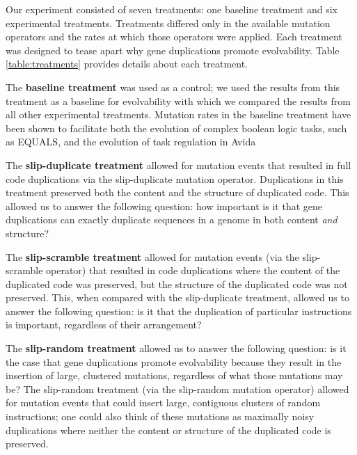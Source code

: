 

Our experiment consisted of seven treatments: one baseline treatment and six experimental treatments. Treatments differed only in the available mutation operators and the rates at which those operators were applied. Each treatment was designed to tease apart why gene duplications promote evolvability. Table \ref{table:treatments} provides details about each treatment.

The \textbf{baseline treatment} was used as a control; we used the results from this treatment as a baseline for evolvability with which we compared the results from all other experimental treatments. Mutation rates in the baseline treatment have been shown to facilitate both the evolution of complex boolean logic tasks, such as EQUALS, and the evolution of task regulation in Avida \citep{lenski2003evolutionary, Lalejini:2016plasticity}

The \textbf{slip-duplicate treatment} allowed for mutation events that resulted in full code duplications via the slip-duplicate mutation operator. Duplications in this treatment preserved both the content and the structure of duplicated code. This allowed us to answer the following question: how important is it that gene duplications can exactly duplicate sequences in a genome in both content \textit{and} structure?

The \textbf{slip-scramble treatment} allowed for mutation events (via the slip-scramble operator) that resulted in code duplications where the content of the duplicated code was preserved, but the structure of the duplicated code was not preserved. This, when compared with the slip-duplicate treatment, allowed us to answer the following question: is it that the duplication of particular instructions is important, regardless of their arrangement?

The \textbf{slip-random treatment} allowed us to answer the following question: is it the case that gene duplications promote evolvability because they result in the insertion of large, clustered mutations, regardless of what those mutations may be? The slip-random treatment (via the slip-random mutation operator) allowed for mutation events that could insert large, contiguous clusters of random instructions; one could also think of these mutations as maximally noisy duplications where neither the content or structure of the duplicated code is preserved.

